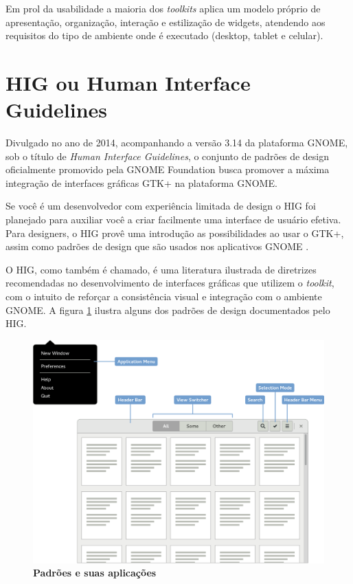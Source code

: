 Em prol da usabilidade a maioria dos \textit{toolkits} aplica um modelo próprio
de apresentação, organização, interação e estilização de widgets, atendendo aos
requisitos do tipo de ambiente onde é executado (desktop, tablet e celular).

\section{HIG ou Human Interface Guidelines}

Divulgado no ano de 2014, acompanhando a versão 3.14 da plataforma GNOME, sob o
título de \textit{Human Interface Guidelines}, o conjunto de padrões de design
oficialmente promovido pela GNOME Foundation busca promover a máxima integração
de interfaces gráficas GTK+ na plataforma GNOME.

\begin{citacao}
    Se você é um desenvolvedor com experiência limitada de design o HIG foi
    planejado para auxiliar você a criar facilmente uma interface de usuário
    efetiva. Para designers, o HIG provê uma introdução as possibilidades ao
    usar o GTK+, assim como padrões de design que são usados nos aplicativos
    GNOME \cite{gnome314hig}.
\end{citacao}

O HIG, como também é chamado, é uma literatura ilustrada de diretrizes
recomendadas no desenvolvimento de interfaces gráficas que utilizem o
\textit{toolkit}, com o intuito de reforçar a consistência visual e integração
com o ambiente GNOME. A figura \ref{gnome-hig-patterns} ilustra alguns dos
padrões de design documentados pelo HIG.

\begin{figure}[!ht]
  \begin{center}
    \caption{\textbf{Padrões e suas aplicações}}
    \label{gnome-hig-patterns}
    \includegraphics[width=\textwidth]{image/hig/patterns.eps}
  \end{center}
\end{figure}

